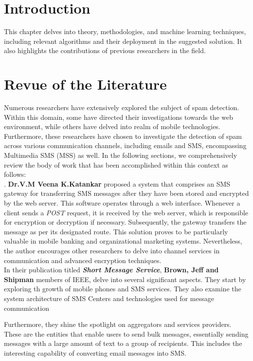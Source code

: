 \documentclass[12pt,a4paper, oneside]{book}
\begin{document}
    \section{Introduction}
    This chapter delves into theory, methodologies, and machine learning techniques, including relevant algorithms and their deployment in the suggested solution. It also highlights the contributions of previous researchers in the field.  
    \section{Revue of the Literature}  
    Numerous researchers have extensively explored the subject of spam detection. Within this domain, some have directed their investigations towards the web environment, while others have delved into realm of mobile	technologies.\\
    
    Furthermore, these researchers have chosen to investigate the detection of spam across various communication channels, including emails and SMS, encompassing Multimedia SMS (MSS) as well. In the following sections, we comprehensively review the body of work that has been accomplished within this context as follows: \\
         
	\citep{katankar2010short}. \textbf{Dr.V.M Veena K.Katankar}
	proposed a system that comprises an SMS gateway for transferring SMS messages after they have been stored and encrypted by the web server. This software operates through a web interface. Whenever a client sends a \textit{POST} request, it is received by the web server, which is responsible for encryption or decryption if necessary. Subsequently, the gateway transfers the message as per its designated route. This solution proves to be particularly valuable in mobile banking and organizational marketing systems. Nevertheless, the author encourages other researchers to delve into channel services in communication and advanced encryption techniques.\\
		
	\citep{brown2007sms} In their publication titled \textbf{\textit{Short Message Service}}, \textbf{Brown, Jeff and Shipman} members of IEEE, delve into several significant aspects. They start by exploring th growth of mobile phones and SMS services. They also examine the system architecture of SMS Centers and technologies used for message communication
	
	Furthermore, they shine the spotlight on aggregators and services providers. These are the entities that enable users to send bulk messages, essentially sending messages with a large amount of text to a group of recipients. This includes the interesting capability of converting email messages into SMS.
	
\end{document}
